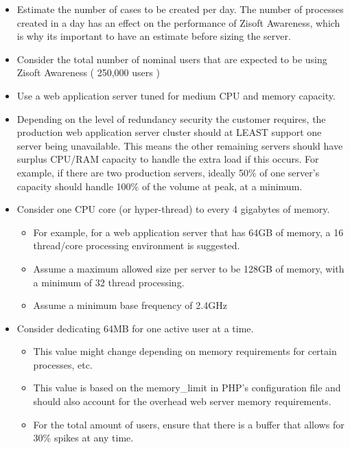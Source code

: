 \documentclass[letterpaper,10pt,english]{sphinxmanual}
\begin{document}
\begin{itemize}
\item {} 
Estimate the number of cases to be created per day. The number of processes created in a day has an effect on the performance of Zisoft Awareness, which is why its important to have an estimate before sizing the server.

\item {} 
Consider the total number of nominal users that are expected to be using Zisoft Awareness ( 250,000 users )

\item {} 
Use a web application server tuned for medium CPU and memory capacity.

\item {} 
Depending on the level of redundancy security the customer requires, the production web application server cluster should at LEAST support one server being unavailable. This means the other remaining servers should have surplus CPU/RAM capacity to handle the extra load if this occurs.
For example, if there are two production servers, ideally 50\% of one server’s capacity should handle 100\% of the volume at peak, at a minimum.

\item {} 
Consider one CPU core (or hyper-thread) to every 4 gigabytes of memory.
\begin{itemize}
\item {} 
For example, for a web application server that has 64GB of memory, a 16 thread/core processing environment is suggested.

\item {} 
Assume a maximum allowed size per server to be 128GB of memory, with a minimum of 32 thread processing.

\item {} 
Assume a minimum base frequency of 2.4GHz

\end{itemize}

\item {} 
Consider dedicating 64MB for one active user at a time.
\begin{itemize}
\item {} 
This value might change depending on memory requirements for certain processes, etc.

\item {} 
This value is based on the memory\_limit in PHP’s configuration file and should also account for the overhead web server memory requirements.

\item {} 
For the total amount of users, ensure that there is a buffer that allows for 30\% spikes at any time.

\end{itemize}

\end{itemize}
\end{document}
